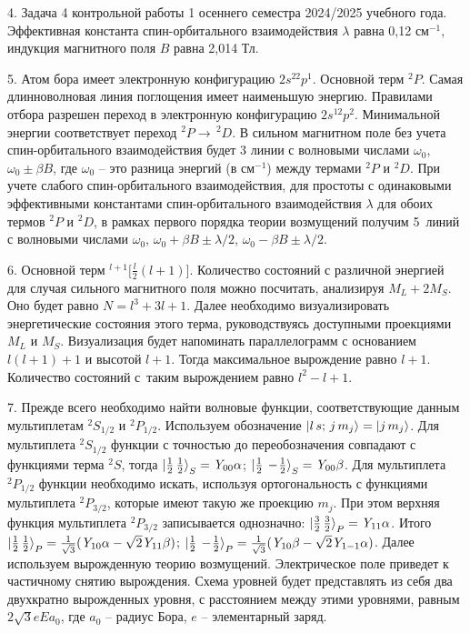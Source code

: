 4. Задача 4 контрольной работы 1 осеннего семестра 2024/2025 учебного года. Эффективная константа спин-орбитального взаимодействия $\lambda$ равна 0,12 см$^{-1}$, индукция магнитного поля $B$ равна 2,014 Тл.\par
5. Атом бора имеет электронную конфигурацию $2s^22p^1$. Основной терм $^2P$. Самая длинноволновая линия поглощения имеет наименьшую энергию. Правилами отбора разрешен переход в электронную конфигурацию $2s^12p^2$. Минимальной энергии соответствует переход $^2P \rightarrow\,^2D$. В сильном магнитном поле без учета спин-орбитального взаимодействия будет 3 линии с волновыми числами $\omega_{0}$, $\omega_{0} \pm \beta B$, где $\omega_{0}$ – это разница энергий (в см$^{-1}$) между термами $^2P$ и $^2D$. При учете слабого спин-орбитального взаимодействия, для простоты с одинаковыми эффективными константами спин-орбитального взаимодействия $\lambda$ для обоих термов $^2P$ и $^2D$, в рамках первого порядка теории возмущений получим 5~линий с волновыми числами $\omega_{0}$, $\omega_{0} + \beta B \pm \lambda/2$, $\omega_{0} - \beta B \pm \lambda/2$.\par
6. Основной терм $^{l+1} \Big[ \frac l2 (l+1) \Big]$. Количество состояний с различной энергией для случая сильного магнитного поля можно посчитать, анализируя $M_L+2M_S$. Оно будет равно $N=l^3+3l+1$. Далее необходимо визуализировать энергетические состояния этого терма, руководствуясь доступными проекциями $M_L$ и $M_S$. Визуализация будет напоминать параллелограмм с основанием $l(l+1)+1$ и высотой $l+1$. Тогда максимальное вырождение равно $l+1$. Количество состояний с~таким вырождением равно $l^2-l+1$.\par
7. Прежде всего необходимо найти волновые функции, соответствующие данным мультиплетам $^2S_{1/2}$ и $^2P_{1/2}$. Используем обозначение $\ket{l\, s;\, j \, m_j} = \ket{j\,m_j}$. Для мультиплета $^2S_{1/2}$ функции с точностью до переобозначения совпадают с функциями терма $^2S$, тогда $\ket{ \frac12 \,  \frac12}_S = \textit{Y}_{00}\alpha$; $\ket{ \frac12\,-\!\frac{1}{2}}_S = \textit{Y}_{00}\beta$. Для мультиплета $^2P_{1/2}$ функции необходимо искать, используя ортогональность с функциями мультиплета $^2P_{3/2}$, которые имеют такую же проекцию $m_j$. При этом верхняя функция мультиплета $^2P_{3/2}$ записывается однозначно: $\ket{ \frac32 \,  \frac32}_P = \textit{Y}_{11}\alpha$. Итого 
$\ket{ \frac12 \,  \frac12}_P = \frac{1}{\sqrt3}(\textit{Y}_{10}\alpha - \sqrt2 \textit{Y}_{11} \beta) $; $\ket{ \frac12\,-\!\frac{1}{2}}_P =  \frac{1}{\sqrt3}(\textit{Y}_{10}\beta - \sqrt2 \textit{Y}_{1-1} \alpha)$. Далее используем вырожденную теорию возмущений. Электрическое поле приведет к частичному снятию вырождения. Схема уровней будет представлять из себя два двухкратно вырожденных уровня, с расстоянием между этими уровнями, равным $2\sqrt3 eEa_0$, где $a_0$ – радиус Бора, $e$ – элементарный заряд.\par
